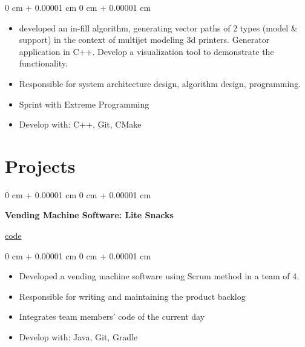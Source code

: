 \documentclass[10pt, letterpaper]{article}
\newenvironment{highlights}{
    \begin{itemize}[
        topsep=0.10 cm,
        parsep=0.10 cm,
        partopsep=0pt,
        itemsep=0pt,
        leftmargin=0 cm + 10pt
    ]
}{
    \end{itemize}
} %
\newenvironment{onecolentry}{
    \begin{adjustwidth}{
        0 cm + 0.00001 cm
    }{
        0 cm + 0.00001 cm
    }
}{
    \end{adjustwidth}
} %
\newenvironment{twocolentry}[2][]{
    \onecolentry
    \def\secondColumn{#2}
    \setcolumnwidth{\fill, 4.5 cm}
    \begin{paracol}{2}
}{
    \switchcolumn \raggedleft \secondColumn
    \end{paracol}
    \endonecolentry
} %
\begin{document}
        \vspace{0.10 cm}
        \begin{onecolentry}
            \begin{highlights}
                \item developed an in-fill algorithm, generating vector paths of 2 types (model \& support) in the context of multijet modeling 3d printers. Generator application in C++. Develop a visualization tool to demonstrate the functionality.
                \item Responsible for system architecture design, algorithm design, programming.
                \item Sprint with Extreme Programming
                \item Develop with: C++, Git, CMake
            \end{highlights}
        \end{onecolentry}

    \section{Projects}
        \begin{twocolentry}{
            \href{https://github.sydney.edu.au/SOT2412-COMP9412-2022S2/Vending-Machine-ASM2}{code}
        }
            \textbf{Vending Machine Software: Lite Snacks}
        \end{twocolentry}
        \vspace{0.10 cm}
        \begin{onecolentry}
            \begin{highlights}
                \item Developed a vending machine software using Scrum method in a team of 4.
                \item Responsible for writing and maintaining the product backlog
                \item Integrates team members' code of the current day
                \item Develop with: Java, Git, Gradle
            \end{highlights}
        \end{onecolentry} 
        \vspace{0.2 cm}
\end{document}

